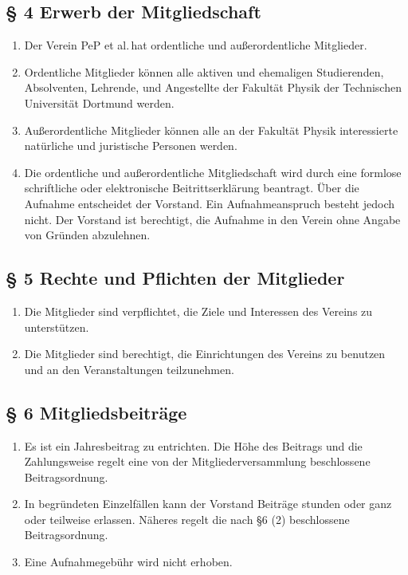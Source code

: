 \documentclass[fontsize=12pt, paper=a4, DIV14, parskip]{scrreprt}
\begin{document}
\subsection{\S{} 4 Erwerb der Mitgliedschaft}

\begin{enumerate}[\qquad(1)]
	\item Der Verein \glqq PeP et al.\grqq$\,$hat ordentliche und außerordentliche Mitglieder.
	\item Ordentliche Mitglieder können alle aktiven und ehemaligen Studierenden, Absolventen, Lehrende, und Angestellte der Fakultät Physik der Technischen Universität Dortmund werden.
	\item Außerordentliche Mitglieder können alle an der Fakultät Physik interessierte natürliche und juristische Personen werden.
	\item Die ordentliche und außerordentliche Mitgliedschaft wird durch eine formlose schriftliche oder elektronische Beitrittserklärung beantragt. Über die Aufnahme entscheidet der Vorstand. Ein Aufnahmeanspruch besteht jedoch nicht. Der Vorstand ist berechtigt, die Aufnahme in den Verein ohne Angabe von Gründen abzulehnen.
\end{enumerate}

\subsection{\S{} 5 Rechte und Pflichten der Mitglieder}

\begin{enumerate}[\qquad(1)]
	\item Die Mitglieder sind verpflichtet, die Ziele und Interessen des Vereins zu unterstützen.
	\item Die Mitglieder sind berechtigt, die Einrichtungen des Vereins zu benutzen und an den Veranstaltungen teilzunehmen.
\end{enumerate}

\subsection{\S{} 6 Mitgliedsbeiträge}

\begin{enumerate}[\qquad(1)]
	\item Es ist ein Jahresbeitrag zu entrichten. Die Höhe des Beitrags und die Zahlungsweise regelt eine von der Mitgliederversammlung beschlossene Beitragsordnung.
	\item In begründeten Einzelfällen kann der Vorstand Beiträge stunden oder ganz oder teilweise erlassen. Näheres regelt die nach §6 (2) beschlossene Beitragsordnung.
	\item Eine Aufnahmegebühr wird nicht erhoben.
\end{enumerate}
\end{document}
